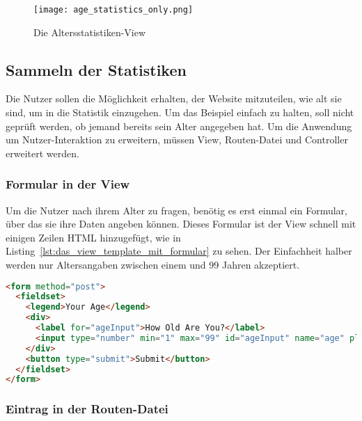 \begin{figure}
\centering
\texttt{[image: age\_statistics\_only.png]}
\caption{Die Altersstatistiken-View}
\label{fig:die_altersstatistiken_view}
\end{figure}




\subsection{Sammeln der Statistiken} %
\label{sub:sammeln_der_statistiken}

Die Nutzer sollen die Möglichkeit erhalten, der Website mitzuteilen, wie alt sie sind, um in die Statistik einzugehen.
Um das Beispiel einfach zu halten, soll nicht geprüft werden, ob jemand bereits sein Alter angegeben hat.
Um die Anwendung um Nutzer-Interaktion zu erweitern, müssen View, Routen-Datei und Controller erweitert werden.

\subsubsection{Formular in der View} %
\label{ssub:formular_in_der_view}

Um die Nutzer nach ihrem Alter zu fragen, benötig es erst einmal ein Formular, über das sie ihre Daten angeben können.
Dieses Formular ist der View schnell mit einigen Zeilen HTML hinzugefügt, wie in Listing~\ref{lst:das_view_template_mit_formular} zu sehen.
Der Einfachheit halber werden nur Altersangaben zwischen einem und 99 Jahren akzeptiert.

\begin{lstlisting}[language=html, caption=Das View-Template mit Formular, label=lst:das_view_template_mit_formular]
<form method="post">
  <fieldset>
    <legend>Your Age</legend>
    <div>
      <label for="ageInput">How Old Are You?</label>
      <input type="number" min="1" max="99" id="ageInput" name="age" placeholder="Enter Age">
    </div>
    <button type="submit">Submit</button>
  </fieldset>
</form>
\end{lstlisting}


\subsubsection{Eintrag in der Routen-Datei} %
\label{ssub:eintrag_in_der_routen_datei}


